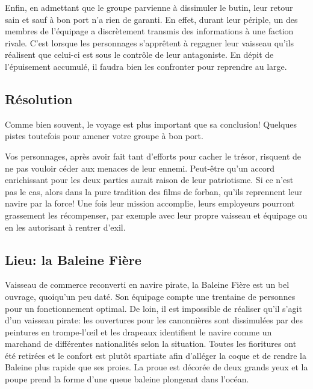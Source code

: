 Enfin, en admettant que le groupe parvienne à dissimuler le butin, leur retour sain et sauf à bon port n'a rien de garanti.
En effet, durant leur périple, un des membres de l'équipage a discrètement transmis des informations à une faction rivale.
C'est lorsque les personnages s'apprêtent à regagner leur vaisseau qu'ils réalisent que celui-ci est sous le contrôle de leur antagoniste.
En dépit de l'épuisement accumulé, il faudra bien les confronter pour reprendre au large.

\subsection{Résolution}

Comme bien souvent, le voyage est plus important que sa conclusion!
Quelques pistes toutefois pour amener votre groupe à bon port.

Vos personnages, après avoir fait tant d'efforts pour cacher le trésor, risquent de ne pas vouloir céder aux menaces de leur ennemi.
Peut-être qu'un accord enrichissant pour les deux parties aurait raison de leur patriotisme.
Si ce n'est pas le cas, alors dans la pure tradition des films de forban, qu'ils reprennent leur navire par la force!
Une fois leur mission accomplie, leurs employeurs pourront grassement les récompenser, par exemple avec leur propre vaisseau et équipage ou en les autorisant à rentrer d'exil.

\subsection{Lieu: la Baleine Fière}

\begin{tcolorbox}[colback=black!1!white]
Vaisseau de commerce reconverti en navire pirate, la Baleine Fière est un bel ouvrage, quoiqu'un peu daté.
Son équipage compte une trentaine de personnes pour un fonctionnement optimal.
De loin, il est impossible de réaliser qu'il s'agit d'un vaisseau pirate: les ouvertures pour les canonnières sont dissimulées par des peintures en trompe-l'œil et les drapeaux identifient le navire comme un marchand de différentes nationalités selon la situation.
Toutes les fioritures ont été retirées et le confort est plutôt spartiate afin d'alléger la coque et de rendre la Baleine plus rapide que ses proies.
La proue est décorée de deux grands yeux et la poupe prend la forme d'une queue baleine plongeant dans l'océan.
\end{tcolorbox}

\vfill
{}
\vfill
